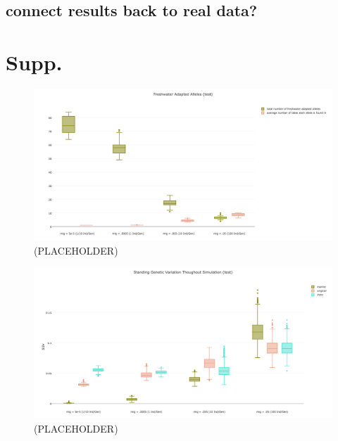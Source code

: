 \documentclass{article}
\newcommand{\plr}[1]{\todo[linecolor=blue,backgroundcolor=blue!25,bordercolor=blue]{#1}}
\begin{document}
\subsection*{connect results back to real data?}





\clearpage

{}

\section{Supp.}

\begin{figure}
	\begin{center}
  		\includegraphics[width=\linewidth]{plotlyPlots/NumFAA.png}
  		\caption{(PLACEHOLDER)}
		\label{fig:NumFAA}
	\end{center}
\end{figure}

\begin{figure}
	\begin{center}
  		\includegraphics[width=\linewidth]{plotlyPlots/StandingGeneticVariation.png}
  		\caption{(PLACEHOLDER)}
		\label{fig:SGV}
	\end{center}
\end{figure}
\end{document}
